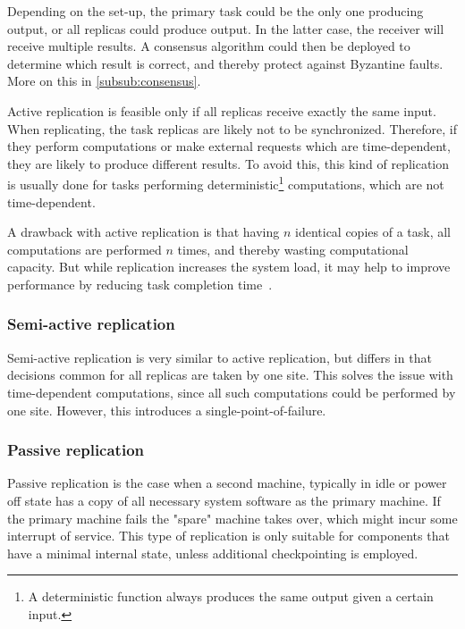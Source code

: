 \documentclass{cslthse-msc}
\begin{document}
Depending on the set-up, the primary task could be the only one producing output, or all replicas could produce output. In the latter case, the receiver will receive multiple results. A consensus algorithm could then be deployed to determine which result is correct, and thereby protect against Byzantine faults. More on this in \cref{subsub:consensus}.

Active replication is feasible only if all replicas receive exactly the same input. When replicating, the task replicas are likely not to be synchronized. Therefore, if they perform computations or make external requests which are time-dependent, they are likely to produce different results. To avoid this, this kind of replication is usually done for tasks performing deterministic\footnote{A deterministic function always produces the same output given a certain input.} computations, which are not time-dependent.

A drawback with active replication is that having $n$ identical copies of a task, all computations are performed $n$ times, and thereby wasting computational capacity. But while replication increases the system load, it may help to improve performance by reducing task completion time~\cite{improvingPerformanceReplication}.

\subsubsection{Semi-active replication} \label{subsec:semi_active_replication}
Semi-active replication is very similar to active replication, but differs in that decisions common for all replicas are taken by one site. This solves the issue with time-dependent computations, since all such computations could be performed by one site. However, this introduces a single-point-of-failure. %

\subsubsection{Passive replication} \label{subsec:passive_replication}
Passive replication is the case when a second machine, typically in idle or power off state has a copy of all necessary system software as the primary machine. If the primary machine fails the "spare" machine takes over, which might incur some interrupt of service. This type of replication is only suitable for components that have a minimal internal state, unless additional checkpointing is employed.
\end{document}
